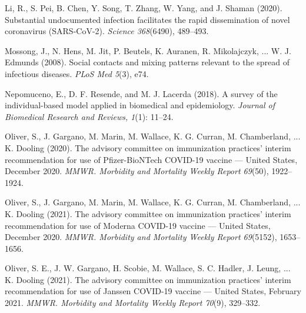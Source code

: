 \documentclass[12pt]{article}
\begin{document}
\begin{singlespace}
\begin{footnotesize}
\begin{list}{}{\setlength{\topsep}{8pt}\setlength{\leftmargin}{0.1in}%
\setlength{\listparindent}{-0.1in}\setlength{\itemindent}{-0.1in}%
\setlength{\parsep}{0.6em}}
\item
Li, R., S. Pei, B. Chen, Y. Song, T. Zhang, W. Yang, and J. Shaman (2020).
Substantial undocumented infection facilitates the rapid dissemination of
novel coronavirus (SARS-CoV-2). \textit{Science 368}(6490), 489--493.%

\item
Mossong, J., N. Hens, M. Jit, P. Beutels, K. Auranen, R. Mikolajczyk, ... W.
J. Edmunds (2008). Social contacts and mixing patterns relevant to the spread
of infectious diseases. \textit{PLoS Med 5}(3), e74.%

\item
Nepomuceno, E., D. F. Resende, and M. J. Lacerda (2018). A survey of the
individual-based model applied in biomedical and epidemiology. \textit{Journal
of Biomedical Research and Reviews,} \textit{1}(1): 11--24.%

\item
Oliver, S., J. Gargano, M. Marin, M. Wallace, K. G. Curran, M. Chamberland,
... K. Dooling (2020). The advisory committee on immunization practices'
interim recommendation for use of Pfizer-BioNTech COVID-19 vaccine --- United
States, December 2020. \textit{MMWR. Morbidity and Mortality Weekly Report
69}(50), 1922--1924.%

\item
Oliver, S., J. Gargano, M. Marin, M. Wallace, K. G. Curran, M. Chamberland,
... K. Dooling (2021). The advisory committee on immunization practices'
interim recommendation for use of Moderna COVID-19 vaccine --- United States,
December 2020. \textit{MMWR. Morbidity and Mortality Weekly Report 69}(5152), 1653--1656.%

\item
Oliver, S. E., J. W. Gargano, H. Scobie, M. Wallace, S. C. Hadler, J. Leung,
... K. Dooling (2021). The advisory committee on immunization practices'
interim recommendation for use of Janssen COVID-19 vaccine --- United States,
February 2021. \textit{MMWR. Morbidity and Mortality Weekly Report 70}(9), 329--332.%


\end{list}
\end{footnotesize}
\end{singlespace}
\end{document}
